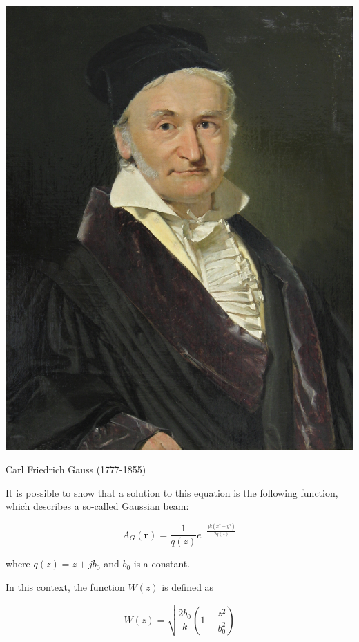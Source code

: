 \begin{marginfigure}[-5cm]
\includegraphics{hermite/figures/c_gauss}
\caption{Carl Friedrich Gauss (1777-1855)}
\end{marginfigure}

It is possible to show that a solution to this equation is the following function, which describes a so-called Gaussian beam:

\begin{equation}
A_G({\mathbf r}) = \frac{1}{q(z)}e^{-\frac{jk(x^2 + y^2)}{2q(z)}} \label{eq-gauss}
\end{equation}   

where $q(z)=z+jb_0$ and $b_0$ is a constant. 

In this context, the function $W(z)$ is defined as

\begin{equation}
W(z)=\sqrt{\frac{2 b_0}{k} \left(1 + \frac{z^2}{b_0^2}\right)} \label{eq-W}
\end{equation} 


